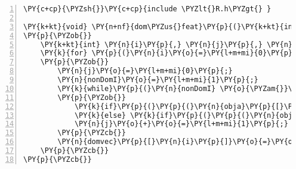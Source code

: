 \begin{Verbatim}[commandchars=\\\{\},codes={\catcode`\$=3\catcode`\^=7\catcode`\_=8},gobble=0,numbers=left,fontfamily=fvm,fontshape=n,fontsize=\footnotesize,tabsize=2]
\PY{c+cp}{\PYZsh{}}\PY{c+cp}{include \PYZlt{}R.h\PYZgt{} }

\PY{k+kt}{void} \PY{n+nf}{dom\PYZus{}feat}\PY{p}{(}\PY{k+kt}{int} \PY{o}{*}\PY{n}{n}\PY{p}{,} \PY{k+kt}{double} \PY{o}{*}\PY{n}{obja}\PY{p}{,} \PY{k+kt}{double} \PY{o}{*}\PY{n}{objb}\PY{p}{,} \PY{k+kt}{int} \PY{o}{*}\PY{n}{domvec}\PY{p}{)}
\PY{p}{\PYZob{}}
	\PY{k+kt}{int} \PY{n}{i}\PY{p}{,} \PY{n}{j}\PY{p}{,} \PY{n}{nonDomI}\PY{p}{;}
	\PY{k}{for} \PY{p}{(}\PY{n}{i}\PY{o}{=}\PY{l+m+mi}{0}\PY{p}{;} \PY{n}{i}\PY{o}{\PYZlt{}}\PY{o}{*}\PY{n}{n}\PY{p}{;} \PY{n}{i}\PY{o}{+}\PY{o}{+}\PY{p}{)}
	\PY{p}{\PYZob{}}
		\PY{n}{j}\PY{o}{=}\PY{l+m+mi}{0}\PY{p}{;}
		\PY{n}{nonDomI}\PY{o}{=}\PY{l+m+mi}{1}\PY{p}{;}
		\PY{k}{while}\PY{p}{(}\PY{n}{nonDomI} \PY{o}{\PYZam{}}\PY{o}{\PYZam{}} \PY{n}{j}\PY{o}{\PYZlt{}}\PY{o}{*}\PY{n}{n}\PY{p}{)}
		\PY{p}{\PYZob{}}
			\PY{k}{if}\PY{p}{(}\PY{p}{(}\PY{n}{obja}\PY{p}{[}\PY{n}{i}\PY{p}{]}\PY{o}{\PYZlt{}}\PY{n}{obja}\PY{p}{[}\PY{n}{j}\PY{p}{]}\PY{p}{)} \PY{o}{\PYZam{}}\PY{o}{\PYZam{}} \PY{p}{(}\PY{n}{objb}\PY{p}{[}\PY{n}{i}\PY{p}{]}\PY{o}{\PYZlt{}}\PY{o}{=}\PY{n}{objb}\PY{p}{[}\PY{n}{j}\PY{p}{]}\PY{p}{)}\PY{p}{)} \PY{n}{nonDomI}\PY{o}{=}\PY{l+m+mi}{0}\PY{p}{;}
			\PY{k}{else} \PY{k}{if}\PY{p}{(}\PY{p}{(}\PY{n}{objb}\PY{p}{[}\PY{n}{i}\PY{p}{]}\PY{o}{\PYZlt{}}\PY{n}{objb}\PY{p}{[}\PY{n}{j}\PY{p}{]}\PY{p}{)} \PY{o}{\PYZam{}}\PY{o}{\PYZam{}} \PY{p}{(}\PY{n}{obja}\PY{p}{[}\PY{n}{i}\PY{p}{]}\PY{o}{\PYZlt{}}\PY{o}{=}\PY{n}{obja}\PY{p}{[}\PY{n}{j}\PY{p}{]}\PY{p}{)}\PY{p}{)} \PY{n}{nonDomI}\PY{o}{=}\PY{l+m+mi}{0}\PY{p}{;}
			\PY{n}{j}\PY{o}{+}\PY{o}{=}\PY{l+m+mi}{1}\PY{p}{;}
		\PY{p}{\PYZcb{}}
		\PY{n}{domvec}\PY{p}{[}\PY{n}{i}\PY{p}{]}\PY{o}{=}\PY{o}{\PYZhy{}}\PY{n}{nonDomI}\PY{o}{+}\PY{l+m+mi}{1}\PY{p}{;}
	\PY{p}{\PYZcb{}}
\PY{p}{\PYZcb{}}
\end{Verbatim}
